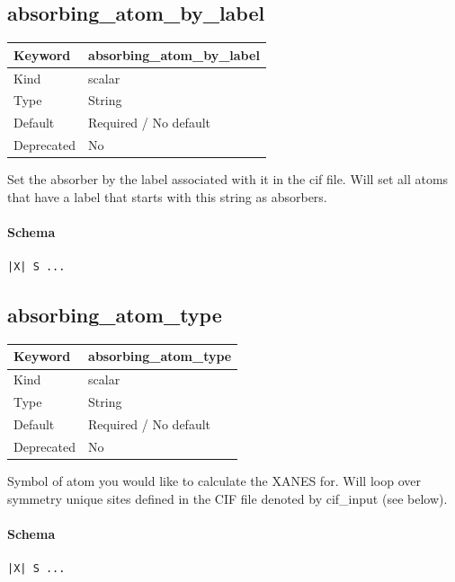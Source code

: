 \documentclass[11pt]{article}
\begin{document}
\subsection{absorbing\_atom\_by\_label}
\label{kw:absorbing-atom-by-label}
\begin{longtable}{|p{1.5in}|p{4.5in}|}
\hline
Keyword & absorbing\_atom\_by\_label \\
\hline
Kind & scalar \\
\hline
Type & String \\
\hline
Default & Required / No default \\
\hline
Deprecated & No \\
\hline
\end{longtable}
 Set the absorber by the label associated with it in the cif file.
 Will set all atoms that have a label that starts with this string as absorbers.

\paragraph{Schema}
\begin{Verbatim}
|X| S ...
\end{Verbatim}

\subsection{absorbing\_atom\_type}
\label{kw:absorbing-atom-type}
\begin{longtable}{|p{1.5in}|p{4.5in}|}
\hline
Keyword & absorbing\_atom\_type \\
\hline
Kind & scalar \\
\hline
Type & String \\
\hline
Default & Required / No default \\
\hline
Deprecated & No \\
\hline
\end{longtable}
 Symbol of atom you would like to calculate the XANES for. Will loop over symmetry unique sites defined
 in the CIF file denoted by cif\_input (see below).

\paragraph{Schema}
\begin{Verbatim}
|X| S ...
\end{Verbatim}
\end{document}
